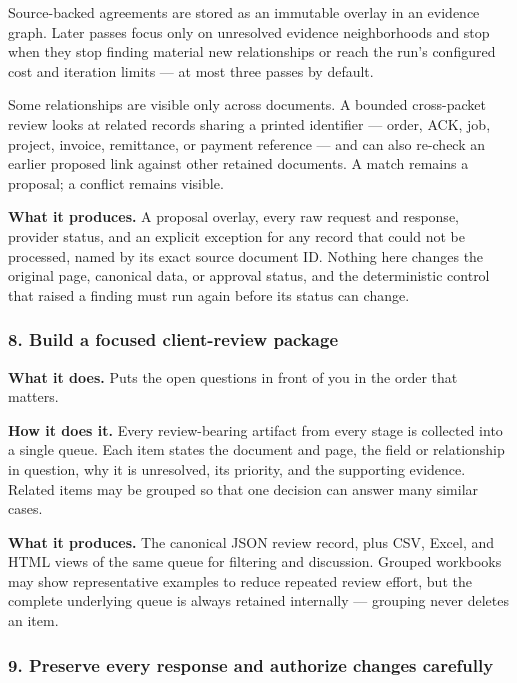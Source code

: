 \documentclass[
]{article}
\begin{document}
Source-backed agreements are stored as an immutable overlay in an
evidence graph. Later passes focus only on unresolved evidence
neighborhoods and stop when they stop finding material new relationships
or reach the run's configured cost and iteration limits --- at most
three passes by default.

Some relationships are visible only across documents. A bounded
cross-packet review looks at related records sharing a printed
identifier --- order, ACK, job, project, invoice, remittance, or payment
reference --- and can also re-check an earlier proposed link against
other retained documents. A match remains a proposal; a conflict remains
visible.

\textbf{What it produces.} A proposal overlay, every raw request and
response, provider status, and an explicit exception for any record that
could not be processed, named by its exact source document ID. Nothing
here changes the original page, canonical data, or approval status, and
the deterministic control that raised a finding must run again before
its status can change.

\subsubsection{8. Build a focused client-review
package}\label{build-a-focused-client-review-package}

\textbf{What it does.} Puts the open questions in front of you in the
order that matters.

\textbf{How it does it.} Every review-bearing artifact from every stage
is collected into a single queue. Each item states the document and
page, the field or relationship in question, why it is unresolved, its
priority, and the supporting evidence. Related items may be grouped so
that one decision can answer many similar cases.

\textbf{What it produces.} The canonical JSON review record, plus CSV,
Excel, and HTML views of the same queue for filtering and discussion.
Grouped workbooks may show representative examples to reduce repeated
review effort, but the complete underlying queue is always retained
internally --- grouping never deletes an item.

\subsubsection{9. Preserve every response and authorize changes
carefully}\label{preserve-every-response-and-authorize-changes-carefully}
\end{document}
